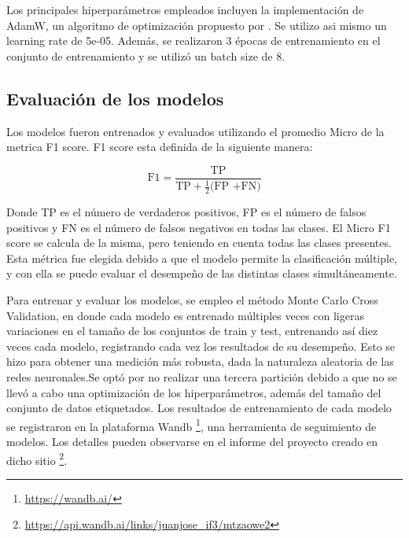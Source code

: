 Los principales hiperparámetros empleados incluyen la implementación de AdamW, un algoritmo de optimización propuesto por \cite{loshchilov2017decoupled}. Se utilizo asi mismo un learning rate de 5e-05. Además, se realizaron 3 épocas de entrenamiento en el conjunto de entrenamiento y se utilizó un batch size de 8.

\subsection{Evaluación de los modelos}

Los modelos fueron entrenados y evaluados utilizando  el promedio Micro de la metrica F1 score. F1 score esta definida de la siguiente manera:


\[
{\text{F1}}=\frac{\text{TP} }{\text{TP} + \frac{1}{2}\text{(FP +FN)}}
\]

Donde TP es el número de verdaderos positivos, FP es el número de falsos positivos y FN es el número de falsos negativos en todas las clases. El Micro F1 score se calcula de la misma, pero teniendo en cuenta todas las clases presentes. Esta métrica fue elegida debido a que el modelo permite la clasificación múltiple, y con ella se puede evaluar el desempeño de las distintas clases simultáneamente.

Para entrenar y evaluar los modelos, se empleo el método Monte Carlo Cross Validation, en donde cada modelo es entrenado múltiples veces con ligeras variaciones en el tamaño de los conjuntos de train y test, entrenando así diez veces cada modelo, registrando cada vez los resultados de su desempeño. Esto se hizo para obtener una medición más robusta, dada la naturaleza aleatoria de las redes neuronales.Se optó por no realizar una tercera partición debido a que no se llevó a cabo una optimización de los hiperparámetros, además del tamaño del conjunto de datos etiquetados. Los resultados de entrenamiento de cada modelo se registraron en la plataforma Wandb \footnote{\url{https://wandb.ai/}}, una herramienta de seguimiento de modelos. Los detalles pueden observarse en el informe del proyecto creado en dicho sitio \footnote{\url{https://api.wandb.ai/links/juanjose_if3/mtzaowe2}}.







